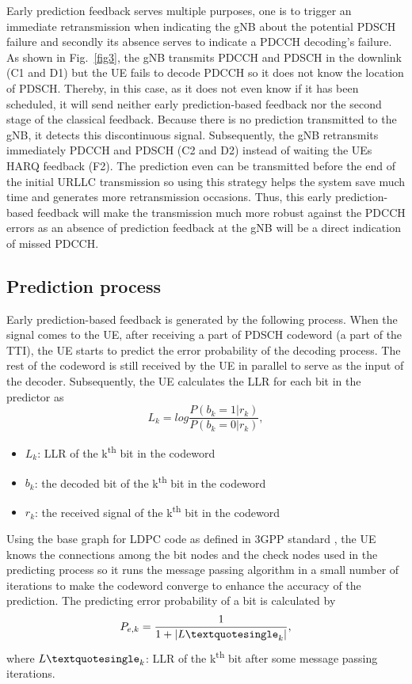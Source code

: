 \documentclass[conference]{IEEEtran}
\begin{document}
Early prediction feedback serves multiple purposes, one is to trigger an immediate retransmission when indicating the gNB about the potential PDSCH failure and secondly its absence serves to indicate a PDCCH decoding's failure. As shown in Fig.~\ref{fig3}, the gNB transmits PDCCH and PDSCH in the downlink (C1 and D1) but the UE fails to decode PDCCH so it does not know the location of PDSCH. Thereby, in this case, as it does not even know if it has been scheduled, it will send neither early prediction-based feedback nor the second stage of the classical feedback. Because there is no prediction transmitted to the gNB, it detects this discontinuous signal. Subsequently, the gNB retransmits immediately PDCCH and PDSCH (C2 and D2) instead of waiting the UE\textquotesingle s HARQ feedback (F2). The prediction even can be transmitted before the end of the initial URLLC transmission so using this strategy helps the system save much time and generates more retransmission occasions. Thus, this early prediction-based feedback will make the transmission much more robust against the PDCCH errors as an absence of prediction feedback at the gNB will be a direct indication of missed PDCCH. 

\subsection{Prediction process}\label{BB}
Early prediction-based feedback is generated by the following process. When the signal comes to the UE, after receiving a part of PDSCH codeword (a part of the TTI), the UE starts to predict the error probability of the decoding process. The rest of the codeword is still received by the UE in parallel to serve as the input of the decoder. Subsequently, the UE calculates the LLR for each bit in the predictor as 
\begin{equation}
    L_{k} = log \frac{P(b_{k}=1|r_{k})}{P(b_{k}=0|r_{k})},
\end{equation}
\begin{itemize}
    \item $L_{k}$: LLR of the k\textsuperscript{th} bit in the codeword 
    \item $b_{k}$: the decoded bit of the k\textsuperscript{th} bit in the codeword
    \item $r_{k}$: the received signal of the k\textsuperscript{th} bit in the codeword
\end{itemize}

Using the base graph for LDPC code as defined in 3GPP standard \cite{b8}, the UE knows the connections among the bit nodes and the check nodes used in the predicting process so it runs the message passing algorithm in a small number of iterations to make the codeword converge to enhance the accuracy of the prediction. The predicting error probability of a bit is calculated by
\begin{equation}
    P_{e,k} = \frac{1}{1 + |L\textquotesingle_{k}|},
\end{equation}
where $L\textquotesingle_{k}$: LLR of the k\textsuperscript{th} bit after some message passing iterations.
\end{document}
